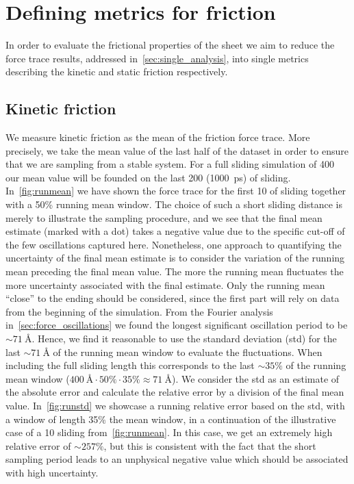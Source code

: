 \section{Defining metrics for friction}\label{sec:fric_metrics}
In order to evaluate the frictional properties of the sheet we aim to reduce the force trace results, addressed in~\cref{sec:single_analysis}, into single metrics describing the kinetic and static friction respectively. 

\subsection{Kinetic friction}
We measure kinetic friction as the mean of the friction force trace. More
precisely, we take the mean value of the last half of the dataset in order to
ensure that we are sampling from a stable system. For a full sliding simulation
of \SI{400}{} our mean value will be founded on the last
\SI{200}{} (\SI{1000}{ps}) of sliding. In~\cref{fig:runmean} we have
shown the force trace for the first \SI{10}{} of sliding together with a
50\% running mean window. The choice of such a short sliding distance is merely
to illustrate the sampling procedure, and we see that the final mean estimate
(marked with a dot) takes a negative value due to the specific cut-off of the
few oscillations captured here. Nonetheless, one approach to quantifying the
uncertainty of the final mean estimate is to consider the variation of the
running mean preceding the final mean value. The more the running mean
fluctuates the more uncertainty associated with the final estimate. Only the
running mean ``close'' to the ending should be considered, since the first part
will rely on data from the beginning of the simulation. From the Fourier analysis
in~\cref{sec:force_oscillations} we found the longest significant
oscillation period to be $\sim \SI{71}{\text{Å}}$. Hence, we find it reasonable
to use the standard deviation (\acrshort{std}) for the last $\sim
\SI{71}{\text{Å}}$ of the running mean window to evaluate the fluctuations. When
including the full sliding length this corresponds to the last $\sim 35 \%$ of
the running mean window ($\SI{400}{\text{Å}}\cdot 50\% \cdot 35\% \approx \SI{71}{\text{Å}}$). We consider the \acrshort{std} as an estimate of the
absolute error and calculate the relative error by a division of the final mean
value. In~\cref{fig:runstd} we showcase a running relative error based on the
\acrshort{std}, with a window of length 35\% the mean window, in a continuation
of the illustrative case of a \SI{10}{} sliding from~\cref{fig:runmean}.
In this case, we get an extremely high relative error of $\sim 257\%$, but this
is consistent with the fact that the short sampling period leads to an
unphysical negative value which should be associated with high uncertainty. 

